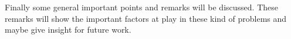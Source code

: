 Finally some general important points and remarks will be discussed. These remarks will show the important factors at play in these kind of problems and maybe give insight for future work.
%
%
%
%
%
%
